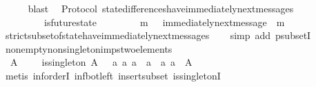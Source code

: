 \begin{isabellebody}
\ \ \ \ \isamarkupfalse%
\ blast\isanewline
{}\isamarkupfalse%
%
\endisatagproof
{\isafoldproof}%
%
\isadelimproof
\isanewline
%
\endisadelimproof
\isanewline
\isanewline
{}\isamarkupfalse%
\ {\isacharparenleft}\ Protocol{\isacharparenright}\ state{\isacharunderscore}differences{\isacharunderscore}have{\isacharunderscore}immediately{\isacharunderscore}next{\isacharunderscore}messages{\isacharcolon}\ \isanewline
\ \ {\isachardoublequoteopen}{\isasymforall}\ {\isasymsigma}\ {\isasymin}\ {\isasymSigma}{\isachardot}\ {\isasymforall}\ {\isasymsigma}{\isacharprime}{\isasymin}\ {\isasymSigma}{\isachardot}\ is{\isacharunderscore}future{\isacharunderscore}state\ {\isacharparenleft}{\isasymsigma}{\isacharcomma}\ {\isasymsigma}{\isacharprime}{\isacharparenright}\ {\isasymand}\ {\isasymsigma}\ {\isasymnoteq}\ {\isasymsigma}{\isacharprime}\ {\isasymlongrightarrow}\ {\isacharparenleft}{\isasymexists}\ m\ {\isasymin}\ {\isasymsigma}{\isacharprime}{\isacharminus}{\isasymsigma}{\isachardot}\ immediately{\isacharunderscore}next{\isacharunderscore}message\ {\isacharparenleft}{\isasymsigma}{\isacharcomma}\ m{\isacharparenright}{\isacharparenright}{\isachardoublequoteclose}\isanewline
%
\isadelimproof
\ \ %
\endisadelimproof
%
\isatagproof
{}\isamarkupfalse%
\ strict{\isacharunderscore}subset{\isacharunderscore}of{\isacharunderscore}state{\isacharunderscore}have{\isacharunderscore}immediately{\isacharunderscore}next{\isacharunderscore}messages\isanewline
\ \ \isamarkupfalse%
\ {\isacharparenleft}simp\ add{\isacharcolon}\ psubsetI{\isacharparenright}%
\endisatagproof
{\isafoldproof}%
%
\isadelimproof
\isanewline
%
\endisadelimproof
\isanewline
{}\isamarkupfalse%
\ non{\isacharunderscore}empty{\isacharunderscore}non{\isacharunderscore}singleton{\isacharunderscore}imps{\isacharunderscore}two{\isacharunderscore}elements\ {\isacharcolon}\ \isanewline
\ \ {\isachardoublequoteopen}A\ {\isasymnoteq}\ {\isasymemptyset}\ {\isasymLongrightarrow}\ {\isasymnot}\ is{\isacharunderscore}singleton\ A\ {\isasymLongrightarrow}\ {\isasymexists}\ a{}\ a{}{\isachardot}\ a{}\ {\isasymnoteq}\ a{}\ {\isasymand}\ {\isacharbraceleft}a{}{\isacharcomma}\ a{}{\isacharbraceright}\ {\isasymsubseteq}\ A{\isachardoublequoteclose}\isanewline
%
\isadelimproof
\ \ %
\endisadelimproof
%
\isatagproof
{}\isamarkupfalse%
\ {\isacharparenleft}metis\ inf{\isachardot}orderI\ inf{\isacharunderscore}bot{\isacharunderscore}left\ insert{\isacharunderscore}subset\ is{\isacharunderscore}singletonI{\isacharprime}{\isacharparenright}%

\end{isabellebody}
